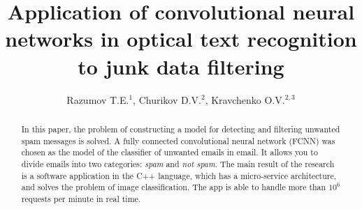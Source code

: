\documentclass[12pt]{jpconf}
\begin{document}
\title{Application of convolutional neural networks in optical text recognition to junk data filtering}
\author{Razumov T.E.$^1$, Churikov D.V.$^2$, Kravchenko O.V.$^{2,3}$}

\address{
$^1$\,Mail.ru Group, Leningradsky pr., 39--79, Moscow, 125167, Russian Federation\\
$^2$\,Scientific and Technological Centre of Unique Instrumentation, Butlerova str., 15, Moscow, 117342, Russian Federation\\
$^3$\,Federal Research Center ``Computer Science and Control'' of RAS, Vavilova st., 40, Moscow, 119333, Russian Federation
}



\begin{abstract}
	In this paper, the problem of constructing a model for detecting and filtering unwanted spam messages is solved. A fully connected convolutional neural network ({FCNN}) was chosen as the model of the classifier of unwanted emails in email. It allows you to divide emails into two categories: \emph{spam} and \emph{not spam}.
	The main result of the research is a software application in the \textsf{C++} language, which has a micro-service architecture, and solves the problem of image classification. The app is able to handle more than $10 ^ 6 $ requests per minute in real time.
\end{abstract}

\end{document}
